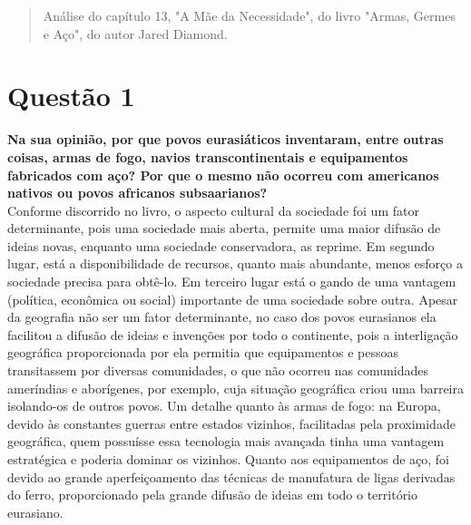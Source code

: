 \date{22 de fevereiro de 2021}



\maketitle

\begin{abstract}
Análise do capítulo 13, "A Mãe da Necessidade", do livro "Armas, Germes e Aço", do autor Jared Diamond.
\end{abstract}


\section{Questão 1}
\label{sec:q1}
\textbf{Na sua opinião, por que povos eurasiáticos inventaram, entre outras coisas, armas de fogo, navios transcontinentais e equipamentos fabricados com aço? Por que o mesmo não ocorreu com americanos nativos ou povos africanos subsaarianos?} \\

Conforme discorrido no livro, o aspecto cultural da sociedade foi um fator determinante, pois uma sociedade mais aberta, permite uma maior difusão de ideias novas, enquanto uma sociedade conservadora, as reprime. Em segundo lugar, está a disponibilidade de recursos, quanto mais abundante, menos esforço a sociedade precisa para obtê-lo. Em terceiro lugar está o gando de uma vantagem (política, econômica ou social) importante de uma sociedade sobre outra. Apesar da geografia não ser um fator determinante, no caso dos povos eurasianos ela facilitou a difusão de ideias e invenções por todo o continente, pois a interligação geográfica proporcionada por ela permitia que equipamentos e pessoas transitassem por diversas comunidades, o que não ocorreu nas comunidades ameríndias e aborígenes, por exemplo, cuja situação geográfica criou uma barreira isolando-os de outros povos. Um detalhe quanto às armas de fogo: na Europa, devido às constantes guerras entre estados vizinhos, facilitadas pela proximidade geográfica, quem possuísse essa tecnologia mais avançada tinha uma vantagem estratégica e poderia dominar os vizinhos. Quanto aos equipamentos de aço, foi devido ao grande aperfeiçoamento das técnicas de manufatura de ligas derivadas do ferro, proporcionado pela grande difusão de ideias em todo o território eurasiano.


